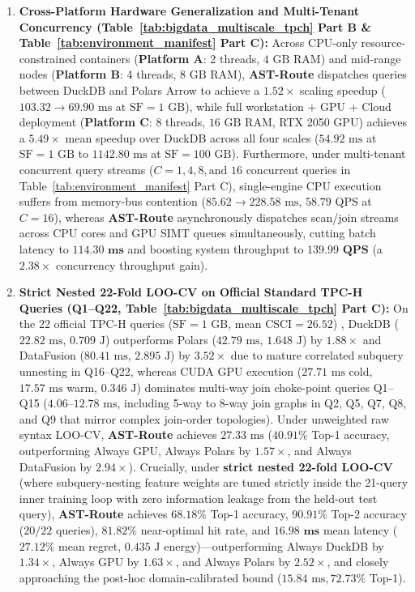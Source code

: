 \documentclass[10pt,a4paper]{article}
\begin{document}
\begin{enumerate}[leftmargin=1.5em,itemsep=2pt]
    \item \textbf{Cross-Platform Hardware Generalization and Multi-Tenant Concurrency (Table~\ref{tab:bigdata_multiscale_tpch} Part B \& Table~\ref{tab:environment_manifest} Part C):} Across CPU-only resource-constrained containers (\textbf{Platform A}: 2 threads, $4\text{ GB}$ RAM) and mid-range nodes (\textbf{Platform B}: 4 threads, $8\text{ GB}$ RAM), \textbf{AST-Route} dispatches queries between DuckDB and Polars Arrow to achieve a $1.52\times$ scaling speedup ($103.32 \rightarrow 69.90\text{ ms}$ at $\text{SF}=1\text{ GB}$), while full workstation + GPU + Cloud deployment (\textbf{Platform C}: 8 threads, $16\text{ GB}$ RAM, RTX 2050 GPU) achieves a $\mathbf{5.49\times}$ mean speedup over DuckDB across all four scales ($54.92\text{ ms}$ at $\text{SF}=1\text{ GB}$ to $1142.80\text{ ms}$ at $\text{SF}=100\text{ GB}$). Furthermore, under multi-tenant concurrent query streams ($C = 1, 4, 8, \text{and } 16$ concurrent queries in Table~\ref{tab:environment_manifest} Part C), single-engine CPU execution suffers from memory-bus contention ($85.62 \rightarrow 228.58\text{ ms}$, $58.79\text{ QPS}$ at $C=16$), whereas \textbf{AST-Route} asynchronously dispatches scan/join streams across CPU cores and GPU SIMT queues simultaneously, cutting batch latency to $\mathbf{114.30\text{ ms}}$ and boosting system throughput to $\mathbf{139.99\text{ QPS}}$ (a $\mathbf{2.38\times}$ concurrency throughput gain).
    \item \textbf{Strict Nested 22-Fold LOO-CV on Official Standard TPC-H Queries (Q1--Q22, Table~\ref{tab:bigdata_multiscale_tpch} Part C):} On the 22 official TPC-H queries ($\text{SF}=1\text{ GB}$, mean $\text{CSCI}=26.52$) \cite{tpc2022tpch,boncz2014tpch}, DuckDB ($22.82\text{ ms}$, $0.709\text{ J}$) outperforms Polars ($42.79\text{ ms}$, $1.648\text{ J}$) by $1.88\times$ and DataFusion ($80.41\text{ ms}$, $2.895\text{ J}$) by $3.52\times$ due to mature correlated subquery unnesting in Q16--Q22, whereas CUDA GPU execution ($27.71\text{ ms}$ cold, $17.57\text{ ms}$ warm, $0.346\text{ J}$) dominates multi-way join choke-point queries Q1--Q15 ($4.06\text{--}12.78\text{ ms}$, including 5-way to 8-way join graphs in Q2, Q5, Q7, Q8, and Q9 that mirror complex join-order topologies). Under unweighted raw syntax LOO-CV, \textbf{AST-Route} achieves $27.33\text{ ms}$ ($40.91\%$ Top-1 accuracy, outperforming Always GPU, Always Polars by $1.57\times$, and Always DataFusion by $2.94\times$). Crucially, under \textbf{strict nested 22-fold LOO-CV} (where subquery-nesting feature weights are tuned strictly inside the 21-query inner training loop with zero information leakage from the held-out test query), \textbf{AST-Route} achieves $\mathbf{68.18\%}$ Top-1 accuracy, $\mathbf{90.91\%}$ Top-2 accuracy ($20/22$ queries), $\mathbf{81.82\%}$ near-optimal hit rate, and $\mathbf{16.98\text{ ms}}$ mean latency ($27.12\%$ mean regret, $0.435\text{ J}$ energy)---outperforming Always DuckDB by $\mathbf{1.34\times}$, Always GPU by $\mathbf{1.63\times}$, and Always Polars by $\mathbf{2.52\times}$, and closely approaching the post-hoc domain-calibrated bound ($15.84\text{ ms}, 72.73\%$ Top-1).
\end{enumerate}
\end{document}
